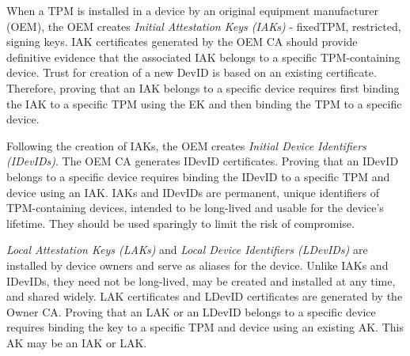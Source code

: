 \documentclass[runningheads]{llncs}
\begin{document}
When a TPM is installed in a device by an original equipment manufacturer (OEM), 
the OEM creates \emph{Initial Attestation Keys (IAKs)} - fixedTPM, restricted, signing 
keys. IAK certificates generated by the OEM CA 
should provide definitive evidence that the associated IAK belongs to a specific 
TPM-containing device. 
Trust for creation of a new DevID is based on an existing certificate.
Therefore, proving that an IAK belongs to a specific device requires first
binding the IAK to a specific TPM using the EK and then binding the TPM to a 
specific device.

Following the creation of IAKs, the OEM creates \emph{Initial Device
  Identifiers (IDevIDs)}. The OEM CA generates IDevID
certificates. Proving that an IDevID belongs to a specific device
requires binding the IDevID to a specific TPM and device using an IAK.
IAKs and IDevIDs are permanent, unique identifiers of TPM-containing
devices, intended to be long-lived and usable for the device's
lifetime.  They should be used sparingly to limit the risk of
compromise.


\emph{Local Attestation Keys (LAKs)} and 
\emph{Local Device Identifiers (LDevIDs)} are installed by device owners
and serve as aliases for the device. Unlike IAKs and IDevIDs, they
need not be long-lived, may be created and installed at any time, and
shared widely. LAK certificates and LDevID certificates are generated by
the Owner CA. Proving that an LAK or an LDevID belongs to a specific device 
requires binding the key to a specific TPM and device using an existing AK. 
This AK may be an IAK or LAK. 
\end{document}
